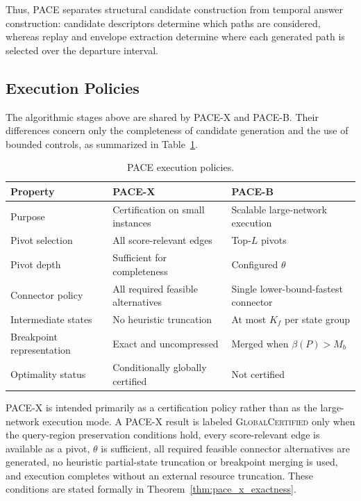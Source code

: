 \documentclass[a4paper,fleqn]{cas-dc}
\begin{document}
Thus, PACE separates structural candidate construction from temporal answer
construction: candidate descriptors determine which paths are considered,
whereas replay and envelope extraction determine where each generated path is
selected over the departure interval.

\subsection{Execution Policies}
\label{subsec:pace_policies}

The algorithmic stages above are shared by PACE-X and PACE-B. Their
differences concern only the completeness of candidate generation and the use
of bounded controls, as summarized in Table~\ref{tab:pace_policies}.

\begin{table}[t]
\centering
\caption{PACE execution policies.}
\label{tab:pace_policies}
\footnotesize
\begin{tabularx}{\linewidth}{@{}lXX@{}}
\toprule
\textbf{Property}
&
\textbf{PACE-X}
&
\textbf{PACE-B}
\\
\midrule

Purpose
&
Certification on small instances
&
Scalable large-network execution
\\

Pivot selection
&
All score-relevant edges
&
Top-\(L\) pivots
\\

Pivot depth
&
Sufficient for completeness
&
Configured \(\theta\)
\\

Connector policy
&
All required feasible alternatives
&
Single lower-bound-fastest connector
\\

Intermediate states
&
No heuristic truncation
&
At most \(K_f\) per state group
\\

Breakpoint representation
&
Exact and uncompressed
&
Merged when \(\beta(P)>M_b\)
\\

Optimality status
&
Conditionally globally certified
&
Not certified
\\

\bottomrule
\end{tabularx}
\end{table}

PACE-X is intended primarily as a certification policy rather than as the
large-network execution mode. A PACE-X result is labeled
\textsc{GlobalCertified} only when the query-region preservation conditions
hold, every score-relevant edge is available as a pivot, \(\theta\) is
sufficient, all required feasible connector alternatives are generated, no
heuristic partial-state truncation or breakpoint merging is used, and
execution completes without an external resource truncation. These conditions
are stated formally in Theorem~\ref{thm:pace_x_exactness}.
\end{document}
